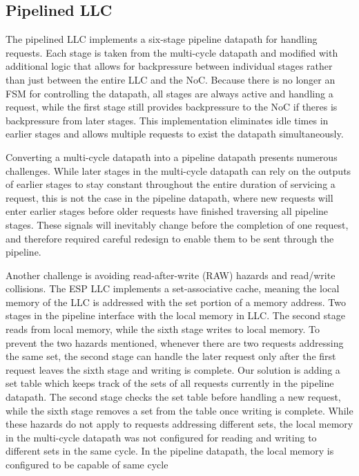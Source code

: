 \subsection{Pipelined LLC}
The pipelined LLC implements a six-stage pipeline datapath for handling requests. Each stage is taken from the multi-cycle datapath and modified with additional logic 
that allows for backpressure between individual stages rather than just between the entire LLC and the NoC. Because there is no longer an FSM for controlling the datapath, 
all stages are always active and handling a request, while the first stage still provides backpressure to the NoC if theres is backpressure from later stages. This implementation
eliminates idle times in earlier stages and allows multiple requests to exist the datapath simultaneously. 
\par Converting a multi-cycle datapath into a pipeline datapath presents numerous challenges. While later stages in the multi-cycle datapath can rely on the outputs of earlier stages to 
stay constant throughout the entire duration of servicing a request, this is not the case in the pipeline datapath, where new requests will enter earlier stages before older requests have finished traversing all pipeline stages. 
These signals will inevitably change before the completion of one request, and therefore required careful redesign to enable them to be sent through the pipeline.
\par Another challenge is avoiding read-after-write (RAW) hazards and read/write collisions. The ESP LLC implements a set-associative cache, meaning the local memory
of the LLC is addressed with the set portion of a memory address. Two stages in the pipeline interface with the local memory in LLC. The second stage 
reads from local memory, while the sixth stage writes to local memory. To prevent the two hazards mentioned, whenever there are two requests addressing the same set, the second stage 
can handle the later request only after the first request leaves the sixth stage and writing is complete. Our solution is adding a set table which keeps track of the sets of all requests currently 
in the pipeline datapath. The second stage checks the set table before handling a new request, while the sixth stage removes a set from the table once writing is complete. While these hazards do not apply to requests addressing 
different sets, the local memory in the multi-cycle datapath was not configured for reading and writing to different sets in the same cycle. In the pipeline datapath, the local memory is configured to be capable of same cycle 
